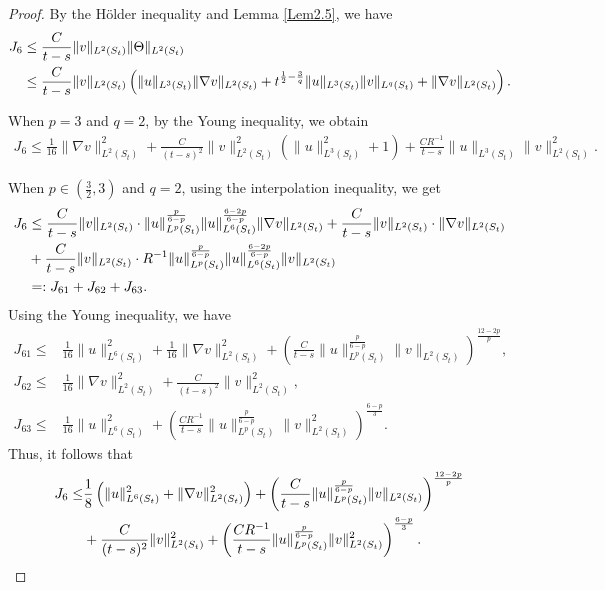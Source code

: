 \documentclass[11pt,reqno]{amsart}
\numberwithin{Thm}{section}
\begin{document}
\begin{proof}
By the H\"older inequality and Lemma \ref{Lem2.5}, we have
	\begin{align}
		J_6&\leq\frac{C}{t-s}\|v\|_{L^2(S_t)}\|\Theta\|_{L^2(S_t)}\notag\\
		&\leq\frac{C}{t-s}\|v\|_{L^2(S_t)}\left(\|u\|_{L^3(S_t)}\|\nabla v\|_{L^2(S_t)} +t^{\frac{1}{2}-\frac{3}{q}}\|u\|_{L^3(S_t)}\|v\|_{L^q(S_t)}+\|\nabla v\|_{L^2(S_t)}\right).\label{ine3.29a}
	\end{align}
	
	When $p=3$ and $q=2$, by the Young inequality,  we obtain
	\begin{align}\label{ine3.30a}
		J_{6}
		\leq\frac{1}{16}\|\nabla v\|_{L^2(S_t)}^2+	\frac{C}{(t-s)^2}\|v\|_{L^2(S_t)}^2 \left(\|u\|_{L^3(S_t)}^2+1\right) + \frac{C R^{-1}}{t-s}\|u\|_{L^3(S_t)}\|v\|_{L^2(S_t)}^2.
	\end{align}

When $p\in\left(\frac{3}{2},3\right)$ and $q=2$, using the interpolation inequality,  we get
\begin{align}
	J_6 &\leq \frac{C}{t-s}\|v\|_{L^2(S_t)} \cdot
	\|u\|_{L^p(S_t)}^{\frac{p}{6-p}} \|u\|_{L^6(S_t)}^{\frac{6-2p}{6-p}} \|\nabla v\|_{L^2(S_t)}
	+\frac{C}{t-s}\|v\|_{L^2(S_t)} \cdot \|\nabla v\|_{L^2(S_t)}\notag\\
	&+\frac{C}{t-s}\|v\|_{L^2(S_t)}\cdot R^{-1}\|u\|_{L^p(S_t)}^{\frac{p}{6-p}} \|u\|_{L^6(S_t)}^{\frac{6-2p}{6-p}} \|v\|_{L^2(S_t)}\label{ine3.31a}\\
	&=: J_{61} + J_{62} + J_{63}.\notag
\end{align}
Using the Young inequality, we have
\begin{align*}
J_{61}\leq& \frac{1}{16}\|u\|_{L^6(S_t)}^2 + \frac{1}{16}\|\nabla v\|_{L^2(S_t)}^2 + \left( \frac{C}{t-s} \|u\|_{L^p(S_t)}^{\frac{p}{6-p}} \|v\|_{L^2(S_t)} \right)^{\frac{12-2p}{p}},\\
J_{62}\leq& \frac{1}{16}\|\nabla v\|_{L^2(S_t)}^2 + \frac{C}{(t-s)^2}\|v\|_{L^2(S_t)}^2,\\
J_{63}\leq& \frac{1}{16}\|u\|_{L^6(S_t)}^2 + \left( \frac{C R^{-1}}{t-s} \|u\|_{L^p(S_t)}^{\frac{p}{6-p}} \|v\|_{L^2(S_t)}^2 \right)^{\frac{6-p}{3}}.
\end{align*}
Thus, it follows that
\begin{align}
J_6 \leq& \frac{1}{8}\left(\|u\|_{L^6(S_t)}^2 + \|\nabla v\|_{L^2(S_t)}^2\right)
		+ \left( \frac{C}{t-s} \|u\|_{L^p(S_t)}^{\frac{p}{6-p}} \|v\|_{L^2(S_t)} \right)^{\frac{12-2p}{p}}\notag\\
&+ \frac{C}{(t-s)^2}\|v\|_{L^2(S_t)}^2+ \left( \frac{C R^{-1}}{t-s} \|u\|_{L^p(S_t)}^{\frac{p}{6-p}} \|v\|_{L^2(S_t)}^2 \right)^{\frac{6-p}{3}}.\label{ine3.32a}
\end{align}



\end{proof}
\end{document}
